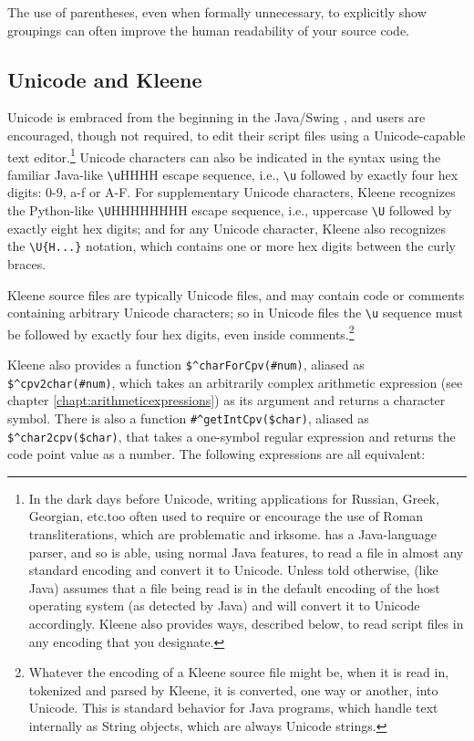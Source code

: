 The use of
parentheses, even when formally unnecessary, to explicitly show groupings can
often improve the human readability of your source code.

\subsection{Unicode and Kleene}

Unicode is embraced from the beginning in the Java/Swing , and users are
encouraged, though not required, to edit their script files using a Unicode-capable text
editor.\footnote{In the dark days before Unicode, writing applications for Russian,
	Greek, Georgian, etc.\@ too often used to require or encourage the use of Roman
	transliterations, which are problematic and irksome.  \Kleene{} has a Java-language parser, and so
	is able, using normal Java features, to read a file in almost any standard encoding
	and convert it to Unicode.  Unless told otherwise, \Kleene{} (like Java) assumes that a file
	being read is in the default encoding of the host operating system (as detected by
Java) and will convert it to Unicode accordingly.  Kleene also provides ways, described
below, to read script files in any encoding that you designate.}  Unicode characters can also be
indicated in the syntax using the familiar Java-like \verb!\u!HHHH escape sequence,
i.e., \verb!\u! followed by exactly four hex digits: 0-9, a-f or A-F.  For
supplementary Unicode characters, Kleene recognizes the Python-like \verb!\U!HHHHHHHH
escape sequence, i.e., uppercase \verb!\U! followed by exactly eight hex digits; and
for any Unicode character, Kleene also recognizes the \verb!\U{H...}! notation, which
contains one or more hex digits between the curly braces.

Kleene source files are typically Unicode files, and may contain code or comments
containing arbitrary Unicode characters; so in Unicode files
the \verb!\u!  sequence must be
followed by exactly four hex digits, even inside comments.\footnote{Whatever
the encoding of a Kleene source file might be, when it is read in, tokenized
and parsed by Kleene, it is converted, one way or another, into Unicode.  This
is standard behavior for Java programs, which handle text internally as
String objects, which are always Unicode strings.}

Kleene also provides a function \verb!$^charForCpv(#num)!, aliased as \verb!$^cpv2char(#num)!, which takes an arbitrarily
complex arithmetic expression (see chapter \ref{chapt:arithmeticexpressions}) as its argument
and returns a character symbol.  There is also a function \verb!#^getIntCpv($char)!, aliased as
\verb!$^char2cpv($char)!, that takes a one-symbol regular expression and returns the code point value as a
number.  The following expressions are all equivalent:

